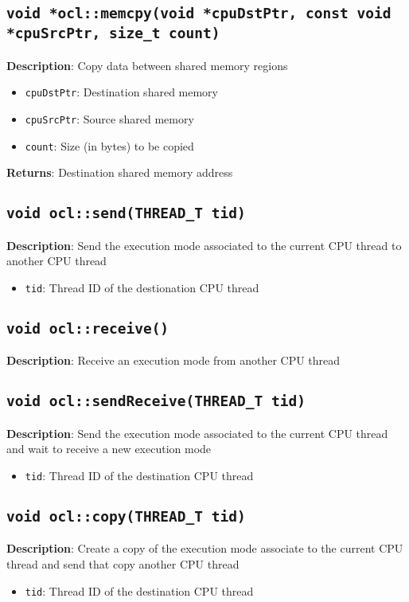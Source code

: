 \subsection{\texttt{void *ocl::memcpy(void *cpuDstPtr, const void *cpuSrcPtr, size\_t count)}}

\textbf{Description}: Copy data between shared memory regions
\begin{itemize}
  \item \texttt{cpuDstPtr}: Destination shared memory
  \item \texttt{cpuSrcPtr}: Source shared memory
  \item \texttt{count}: Size (in bytes) to be copied
\end{itemize}
\textbf{Returns}: Destination shared memory address

\subsection{\texttt{void ocl::send(THREAD\_T tid)}}

\textbf{Description}: Send the execution mode associated to the current CPU thread to another CPU thread
\begin{itemize}
  \item \texttt{tid}: Thread ID of the destionation CPU thread
\end{itemize}

\subsection{\texttt{void ocl::receive()}}

\textbf{Description}: Receive an execution mode from another CPU thread

\subsection{\texttt{void ocl::sendReceive(THREAD\_T tid)}}

\textbf{Description}: Send the execution mode associated to the current CPU thread and wait to receive a new execution mode
\begin{itemize}
  \item \texttt{tid}: Thread ID of the destination CPU thread
\end{itemize}

\subsection{\texttt{void ocl::copy(THREAD\_T tid)}}

\textbf{Description}: Create a copy of the execution mode associate to the current CPU thread and send that copy another CPU thread
\begin{itemize}
  \item \texttt{tid}: Thread ID of the destination CPU thread
\end{itemize}


